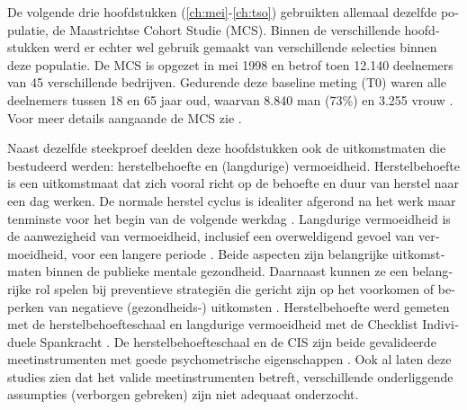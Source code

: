 \begin{otherlanguage}{dutch}
De volgende drie hoofdstukken (\ref{ch:mei}-\ref{ch:tso}) gebruikten allemaal dezelfde populatie, de Maastrichtse Cohort Studie (MCS). Binnen de verschillende hoofdstukken werd er echter wel gebruik gemaakt van verschillende selecties binnen deze populatie. De MCS is opgezet in mei 1998 en betrof toen 12.140 deelnemers van 45 verschillende bedrijven. Gedurende deze baseline meting (T0) waren alle deelnemers tussen 18 en 65 jaar oud, waarvan 8.840 man (73\%) en 3.255 vrouw \parencite{Kant_2003, Mohren_2007}. Voor meer details aangaande de MCS zie \textcite{Mohren_2007}. 

Naast dezelfde steekproef deelden deze hoofdstukken ook de uitkomstmaten die bestudeerd werden: herstelbehoefte en (langdurige) vermoeidheid. Herstelbehoefte is een uitkomstmaat dat zich vooral richt op de behoefte en duur van herstel naar een dag werken. De normale herstel cyclus is idealiter afgerond na het werk maar tenminste voor het begin van de volgende werkdag \parencite{Veldhoven_2008}. Langdurige vermoeidheid is de aanwezigheid van vermoeidheid, inclusief een overweldigend gevoel van vermoeidheid, voor een langere periode \parencite{Bultmann_2000,Kalkman_2008}. Beide aspecten zijn belangrijke uitkomstmaten binnen de publieke mentale gezondheid. Daarnaast kunnen ze een belangrijke rol spelen bij preventieve strategi\"en die gericht zijn op het voorkomen of beperken van negatieve (gezondheids-) uitkomsten \parencite[bijv.,][]{Croon_2003,Amelsvoort_2003,Raeve_2009,Amelsvoort_2002,Silva_2012}. Herstelbehoefte werd gemeten met de herstelbehoefteschaal \parencite{Veldhoven_2003} en langdurige vermoeidheid met de Checklist Individuele Spankracht \parencite{Vercoulen_1994,Beurskens_2000}. De herstelbehoefteschaal en de CIS zijn beide gevalideerde meetinstrumenten met goede psychometrische eigenschappen \parencite[bijv.,][]{Veldhoven_2003,Bultmann_2000,Beurskens_2000,Sluiter_2001,Amelsvoort_2003}. Ook al laten deze studies zien dat het valide meetinstrumenten betreft, verschillende onderliggende assumpties (verborgen gebreken) zijn niet adequaat onderzocht. 


\end{otherlanguage}
